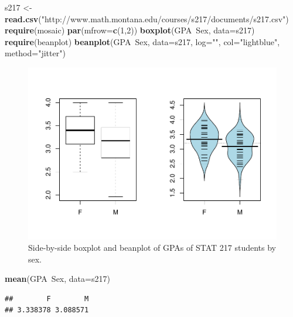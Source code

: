 \documentclass[]{book}
\newenvironment{Shaded}{\begin{snugshade}}{\end{snugshade}}
\newcommand{\KeywordTok}[1]{\textcolor[rgb]{0.13,0.29,0.53}{\textbf{{#1}}}}
\newcommand{\DataTypeTok}[1]{\textcolor[rgb]{0.13,0.29,0.53}{{#1}}}
\newcommand{\DecValTok}[1]{\textcolor[rgb]{0.00,0.00,0.81}{{#1}}}
\newcommand{\StringTok}[1]{\textcolor[rgb]{0.31,0.60,0.02}{{#1}}}
\newcommand{\NormalTok}[1]{{#1}}
\begin{document}
\begin{Shaded}
\begin{Highlighting}[]
\NormalTok{s217 <-}\StringTok{ }\KeywordTok{read.csv}\NormalTok{(}\StringTok{"http://www.math.montana.edu/courses/s217/documents/s217.csv"}\NormalTok{)}
\KeywordTok{require}\NormalTok{(mosaic)}
\KeywordTok{par}\NormalTok{(}\DataTypeTok{mfrow=}\KeywordTok{c}\NormalTok{(}\DecValTok{1}\NormalTok{,}\DecValTok{2}\NormalTok{))}
\KeywordTok{boxplot}\NormalTok{(GPA~Sex, }\DataTypeTok{data=}\NormalTok{s217)}
\KeywordTok{require}\NormalTok{(beanplot)}
\KeywordTok{beanplot}\NormalTok{(GPA~Sex, }\DataTypeTok{data=}\NormalTok{s217, }\DataTypeTok{log=}\StringTok{""}\NormalTok{, }\DataTypeTok{col=}\StringTok{"lightblue"}\NormalTok{, }\DataTypeTok{method=}\StringTok{"jitter"}\NormalTok{)}
\end{Highlighting}
\end{Shaded}

\begin{figure}[htbp]
\centering
\includegraphics{GreenwoodBanner_files/figure-latex/Figure2-15-1.pdf}
\caption{\label{fig:Figure2-15}Side-by-side boxplot and beanplot of GPAs of STAT 217
students by sex.}
\end{figure}

\begin{Shaded}
\begin{Highlighting}[]
\KeywordTok{mean}\NormalTok{(GPA~Sex, }\DataTypeTok{data=}\NormalTok{s217)}
\end{Highlighting}
\end{Shaded}

\begin{verbatim}
##        F        M 
## 3.338378 3.088571
\end{verbatim}
\end{document}
